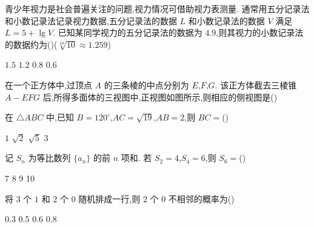 \begin{problem}
青少年视力是社会普遍关注的问题,视力情况可借助视力表测量. 通常用五分记录法和小数记录法记录视力数据,五分记录法的数据 \(L\) 和小数记录法的数据 \(V\) 满足 \(L=5+\lg V\). 已知某同学视力的五分记录法的数据为 \(4.9\),则其视力的小数记录法的数据约为(\quad)(\(\sqrt[10]{10}\approx 1.259\))

\choices
    {\(1.5\)}
    {\(1.2\)}
    {\(0.8\)}
    {\(0.6\)}

\end{problem}

\begin{problem}
在一个正方体中,过顶点 \(A\) 的三条棱的中点分别为 \(E\),\(F\),\(G\). 该正方体截去三棱锥 \(A-EFG\) 后,所得多面体的三视图中,正视图如图所示,则相应的侧视图是(\quad)


\choices
    {}
    {}
    {}
    {}

\end{problem}

\begin{problem}
在 \(\triangle ABC\) 中,已知 \(B=120^\circ\),\(AC=\sqrt{19}\),\(AB=2\),则 \(BC=\)(\quad)

\choices
    {\(1\)}
    {\(\sqrt{2}\)}
    {\(\sqrt{5}\)}
    {\(3\)}

\end{problem}

\begin{problem}
记 \(S_n\) 为等比数列 \(\{a_n\}\) 的前 \(n\) 项和. 若 \(S_2=4\),\(S_4=6\),则 \(S_6=\)(\quad)

\choices
    {7}
    {8}
    {9}
    {10}

\end{problem}

\begin{problem}
将 \(3\) 个 \(1\) 和 \(2\) 个 \(0\) 随机排成一行,则 \(2\) 个 \(0\) 不相邻的概率为(\quad)

\choices
    {0.3}
    {0.5}
    {0.6}
    {0.8}

\end{problem}

